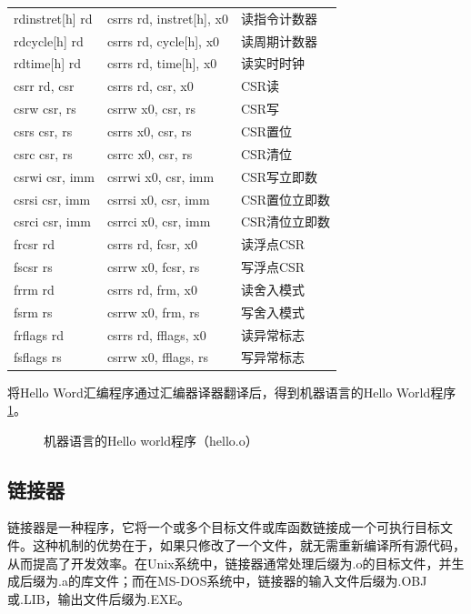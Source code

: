 \begin{longtable}{>{\centering\arraybackslash}p{5cm} >{\centering\arraybackslash}p{5.2cm} >{\centering\arraybackslash}p{5cm}}
	\midrule
	rdinstret[h] rd & csrrs rd, instret[h], x0          & 读指令计数器      \\
	rdcycle[h] rd   & csrrs rd, cycle[h], x0            & 读周期计数器      \\
	rdtime[h] rd    & csrrs rd, time[h], x0             & 读实时时钟       \\
	\midrule
	csrr rd, csr    & csrrs rd, csr, x0                 & CSR读        \\
	csrw csr, rs    & csrrw x0, csr, rs                 & CSR写        \\
	csrs csr, rs    & csrrs x0, csr, rs                 & CSR置位       \\
	csrc csr, rs    & csrrc x0, csr, rs                 & CSR清位       \\
	\midrule
	csrwi csr, imm  & csrrwi x0, csr, imm               & CSR写立即数     \\
	csrsi csr, imm  & csrrsi x0, csr, imm               & CSR置位立即数    \\
	csrci csr, imm  & csrrci x0, csr, imm               & CSR清位立即数    \\
	\midrule
	frcsr rd        & csrrs rd, fcsr, x0                & 读浮点CSR      \\
	fscsr rs        & csrrw x0, fcsr, rs                & 写浮点CSR      \\
	\midrule
	frrm rd         & csrrs rd, frm, x0                 & 读舍入模式       \\
	fsrm rs         & csrrw x0, frm, rs                 & 写舍入模式       \\
	\midrule
	frflags rd      & csrrs rd, fflags, x0              & 读异常标志       \\
	fsflags rs      & csrrw x0, fflags, rs              & 写异常标志       \\
\end{longtable}
\label{tab:riscv_pseudoinstruction}

将Hello Word汇编程序通过汇编器译器翻译后，得到机器语言的Hello World程序\ref{fig:hello_o_example}。

\begin{figure}[htbp]
	\centering
	
	\caption{机器语言的Hello world程序（hello.o）}
	\label{fig:hello_o_example}
\end{figure}

\subsection{链接器}
链接器是一种程序，它将一个或多个目标文件或库函数链接成一个可执行目标文件。这种机制的优势在于，如果只修改了一个文件，就无需重新编译所有源代码，从而提高了开发效率。在Unix系统中，链接器通常处理后缀为.o的目标文件，并生成后缀为.a的库文件；而在MS-DOS系统中，链接器的输入文件后缀为.OBJ或.LIB，输出文件后缀为.EXE。

